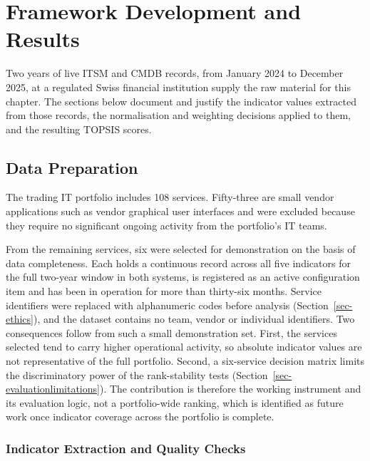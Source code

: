 \documentclass[
  12pt,
  letterpaper,
  12pt,
  oneside,
  english,
  onehalfspacing,
  headsepline]{MastersDoctoralThesis}
\begin{document}

\chapter{Framework Development and Results}\label{sec-chapter4}

Two years of live ITSM and CMDB records, from January 2024 to December
2025, at a regulated Swiss financial institution supply the raw material
for this chapter. The sections below document and justify the indicator
values extracted from those records, the normalisation and weighting
decisions applied to them, and the resulting TOPSIS scores.

\section{Data Preparation}\label{sec-dataprep}

The trading IT portfolio includes 108 services. Fifty-three are small
vendor applications such as vendor graphical user interfaces and were
excluded because they require no significant ongoing activity from the
portfolio's IT teams.

From the remaining services, six were selected for demonstration on the
basis of data completeness. Each holds a continuous record across all
five indicators for the full two-year window in both systems, is
registered as an active configuration item and has been in operation for
more than thirty-six months. Service identifiers were replaced with
alphanumeric codes before analysis (Section~\ref{sec-ethics}), and the
dataset contains no team, vendor or individual identifiers. Two
consequences follow from such a small demonstration set. First, the
services selected tend to carry higher operational activity, so absolute
indicator values are not representative of the full portfolio. Second, a
six-service decision matrix limits the discriminatory power of the
rank-stability tests (Section~\ref{sec-evaluationlimitations}). The
contribution is therefore the working instrument and its evaluation
logic, not a portfolio-wide ranking, which is identified as future work
once indicator coverage across the portfolio is complete.

\subsection{Indicator Extraction and Quality
Checks}\label{indicator-extraction-and-quality-checks}
\end{document}

